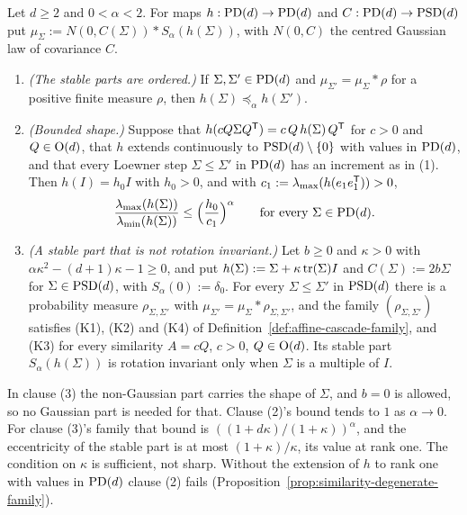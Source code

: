 \begin{proposition}\label{prop:similarity-stable-family}
Let $d \ge 2$ and $0 < \alpha < 2$. For maps $h : \mathrm{PD}(d) \to \mathrm{PD}(d)$ and $C : \mathrm{PD}(d) \to \mathrm{PSD}(d)$
put $\mu_\Sigma := N(0,C(\Sigma)) * S_\alpha(h(\Sigma))$, with $N(0,C)$ the centred Gaussian law of
covariance $C$.
\begin{enumerate}
\item \emph{(The stable parts are ordered.)} If $\Sigma, \Sigma' \in \mathrm{PD}(d)$ and
$\mu_{\Sigma'} = \mu_\Sigma * \rho$ for a positive finite measure $\rho$, then
$h(\Sigma) \preceq_\alpha h(\Sigma')$.
\item \emph{(Bounded shape.)} Suppose that $h(cQ\Sigma Q^{\mathsf{T}}) = c\,Q\,h(\Sigma)\,Q^{\mathsf{T}}$ for $c > 0$
and $Q \in \mathrm{O}(d)$, that $h$ extends continuously to $\mathrm{PSD}(d) \setminus \{0\}$ with values in
$\mathrm{PD}(d)$, and that every Loewner step $\Sigma \le \Sigma'$ in $\mathrm{PD}(d)$ has an increment as in (1).
Then $h(I) = h_0I$ with $h_0 > 0$, and with $c_1 := \lambda_{\max}(h(e_1e_1^{\mathsf{T}})) > 0$,
\[
  \frac{\lambda_{\max}(h(\Sigma))}{\lambda_{\min}(h(\Sigma))} \le \Bigl(\frac{h_0}{c_1}\Bigr)^{\alpha}
  \qquad \text{for every } \Sigma \in \mathrm{PD}(d) .
\]
\item \emph{(A stable part that is not rotation invariant.)} Let $b \ge 0$ and $\kappa > 0$ with
$\alpha\kappa^2 - (d+1)\kappa - 1 \ge 0$, and put $h(\Sigma) := \Sigma + \kappa\operatorname{tr}(\Sigma)I$ and
$C(\Sigma) := 2b\Sigma$ for $\Sigma \in \mathrm{PSD}(d)$, with $S_\alpha(0) := \delta_0$. For every
$\Sigma \le \Sigma'$ in $\mathrm{PSD}(d)$ there is a probability measure $\rho_{\Sigma,\Sigma'}$ with
$\mu_{\Sigma'} = \mu_\Sigma * \rho_{\Sigma,\Sigma'}$, and the family $(\rho_{\Sigma,\Sigma'})$ satisfies
(K1), (K2) and (K4) of Definition~\ref{def:affine-cascade-family}, and (K3) for every similarity $A = cQ$,
$c > 0$, $Q \in \mathrm{O}(d)$. Its stable part $S_\alpha(h(\Sigma))$ is rotation invariant only when
$\Sigma$ is a multiple of $I$.
\end{enumerate}
\end{proposition}

In clause (3) the non-Gaussian part carries the shape of $\Sigma$, and $b = 0$ is allowed, so no
Gaussian part is needed for that. Clause (2)'s bound tends to $1$ as $\alpha \to 0$. For clause (3)'s family
that bound is $((1 + d\kappa)/(1 + \kappa))^\alpha$, and the eccentricity of the stable part is at most
$(1 + \kappa)/\kappa$, its value at rank one. The condition on
$\kappa$ is sufficient, not sharp. Without the extension of $h$ to rank one with values in $\mathrm{PD}(d)$
clause (2) fails (Proposition~\ref{prop:similarity-degenerate-family}).

